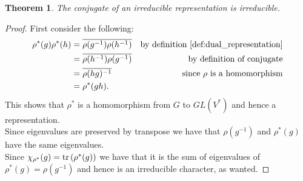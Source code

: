 \documentclass{article}
\theoremstyle{plain}
\newtheorem{theorem}{Theorem}
\theoremstyle{centered}
\newcommand{\tr}[1]{\textnormal{tr}\left(#1\right)}
\newcommand{\conj}[1]{\overline{#1}}
\begin{document}
        \begin{theorem}\label{thm:irr-conj}
            The conjugate of an irreducible representation is irreducible.
        \end{theorem}
        \begin{proof}
            First consider the following:
            \begin{align*}
            \rho^*(g)\rho^*(h) &= \conj{\rho(g^{-1})} \conj{\rho(h^{-1})} & \text{by definition \ref{def:dual_representation}}\\
            &= \conj{\rho(h^{-1})\rho(g^{-1})} & \text{by definition of conjugate}\\
            &= \conj{\rho(hg)^{-1}} & \text{since $\rho$ is a homomorphism}\\
            &= \rho^*(gh).
            \end{align*}
            This shows that $\rho^*$ is a homomorphism from $G$ to $GL(V^*)$ and hence a representation.\\
            Since eigenvalues are preserved by transpose we have that $\rho(g^{-1})$ and $\rho^*(g)$ have the same eigenvalues.\\
            Since $\chi_{\rho^*}(g) = \tr{\rho^*(g)}$ we have that it is the sum of eigenvalues of $\rho^*(g) = \rho(g^{-1})$ and hence is an irreducible character, as wanted.
        \end{proof}
\end{document}
